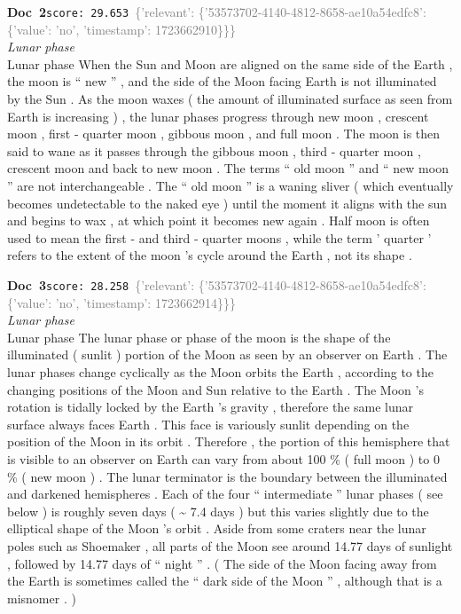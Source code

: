 \documentclass[a4paper,11pt]{article}
\begin{document}
\begin{docenv}
{\footnotesize\textcolor{doccolor}{\textbf{Doc~2}}}\hfill{\tiny\texttt{score:~29.653}}\ {\tiny\textcolor{gray}{\{'relevant': \{'53573702-4140-4812-8658-ae10a54edfc8': \{'value': 'no', 'timestamp': 1723662910\}\}\}}}\\[3pt]
{\small\textit{Lunar phase}}\\[2pt]
\vspace{2pt}
{\footnotesize Lunar phase
When the Sun and Moon are aligned on the same side of the Earth , the moon is `` new '' , and the side of the Moon facing Earth is not illuminated by the Sun . As the moon waxes ( the amount of illuminated surface as seen from Earth is increasing ) , the lunar phases progress through new moon , crescent moon , first - quarter moon , gibbous moon , and full moon . The moon is then said to wane as it passes through the gibbous moon , third - quarter moon , crescent moon and back to new moon . The terms `` old moon '' and `` new moon '' are not interchangeable . The `` old moon '' is a waning sliver ( which eventually becomes undetectable to the naked eye ) until the moment it aligns with the sun and begins to wax , at which point it becomes new again . Half moon is often used to mean the first - and third - quarter moons , while the term ' quarter ' refers to the extent of the moon 's cycle around the Earth , not its shape .}
\end{docenv}
\begin{docenv}
{\footnotesize\textcolor{doccolor}{\textbf{Doc~3}}}\hfill{\tiny\texttt{score:~28.258}}\ {\tiny\textcolor{gray}{\{'relevant': \{'53573702-4140-4812-8658-ae10a54edfc8': \{'value': 'no', 'timestamp': 1723662914\}\}\}}}\\[3pt]
{\small\textit{Lunar phase}}\\[2pt]
\vspace{2pt}
{\footnotesize Lunar phase
The lunar phase or phase of the moon is the shape of the illuminated ( sunlit ) portion of the Moon as seen by an observer on Earth . The lunar phases change cyclically as the Moon orbits the Earth , according to the changing positions of the Moon and Sun relative to the Earth . The Moon 's rotation is tidally locked by the Earth 's gravity , therefore the same lunar surface always faces Earth . This face is variously sunlit depending on the position of the Moon in its orbit . Therefore , the portion of this hemisphere that is visible to an observer on Earth can vary from about 100 \% ( full moon ) to 0 \% ( new moon ) . The lunar terminator is the boundary between the illuminated and darkened hemispheres . Each of the four `` intermediate '' lunar phases ( see below ) is roughly seven days ( \textasciitilde{} 7.4 days ) but this varies slightly due to the elliptical shape of the Moon 's orbit . Aside from some craters near the lunar poles such as Shoemaker , all parts of the Moon see around 14.77 days of sunlight , followed by 14.77 days of `` night '' . ( The side of the Moon facing away from the Earth is sometimes called the `` dark side of the Moon '' , although that is a misnomer . )}
\end{docenv}
\end{document}

